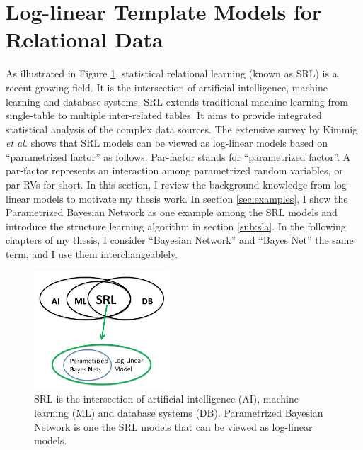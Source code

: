\documentclass{sfuthesis}
\begin{document}
\section{Log-linear Template Models for Relational Data} \label{sec:log-linear}
As illustrated in Figure \ref{fig:relVan}, statistical relational learning (known as SRL) is a recent growing field. It is the intersection of artificial intelligence, machine learning and database systems. SRL extends traditional machine learning from single-table to multiple inter-related tables. It aims to provide integrated statistical analysis of the complex data sources.  The extensive survey by Kimmig {\em et al.} \cite{Kimmig2015}  shows that  SRL models can be viewed as log-linear models based on ``parametrized factor'' as follows. 
Par-factor stands for ``parametrized factor''. 
A par-factor represents an interaction among parametrized random variables, or par-RVs for short. In this section, I review the background knowledge from log-linear models to motivate my thesis work. In section \ref{sec:examples}, I show the Parametrized Bayesian Network as one example among the SRL models and introduce the structure learning algorithm in section \ref{sub:sla}. In the following chapters of my thesis, I consider ``Bayesian Network''  and  ``Bayes Net'' the same term, and I use them  interchangeablely.

\begin{figure}[htbp] %
 \centering
  \includegraphics[width=0.45\textwidth]{relVan.png} 
	\caption{ SRL is the intersection of artificial intelligence (AI), machine learning (ML) and database systems (DB).  Parametrized Bayesian Network is one the SRL models that can be viewed as log-linear models.\label{fig:relVan}}  
\end{figure}
\end{document}

